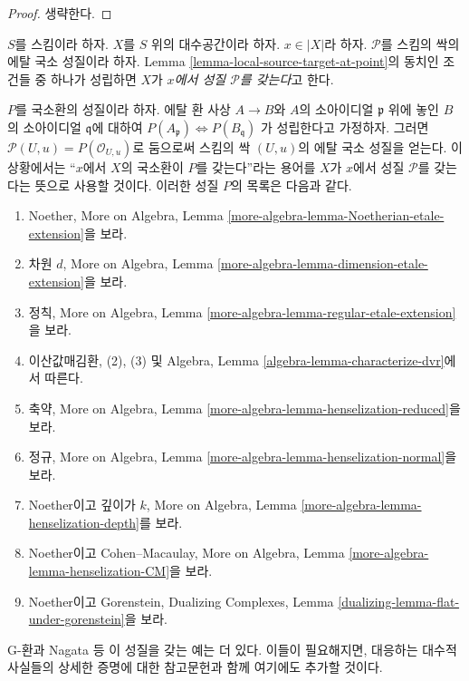 \begin{proof}
생략한다.
\end{proof}

\begin{definition}
\label{definition-property-at-point}
$S$를 스킴이라 하자. $X$를 $S$ 위의 대수공간이라 하자.
$x \in |X|$라 하자. $\mathcal{P}$를 스킴의 싹의 에탈 국소 성질이라 하자.
Lemma \ref{lemma-local-source-target-at-point}의 동치인 조건들 중 하나가
성립하면 $X$가 {\it $x$에서 성질 $\mathcal{P}$를 갖는다}고 한다.
\end{definition}

\begin{remark}
\label{remark-list-properties-local-ring-local-etale-topology}
$P$를 국소환의 성질이라 하자. 에탈 환 사상 $A \to B$와
$A$의 소아이디얼 $\mathfrak p$ 위에 놓인 $B$의 소아이디얼
$\mathfrak q$에 대하여
$P(A_\mathfrak p) \Leftrightarrow P(B_\mathfrak q)$
가 성립한다고 가정하자. 그러면
$\mathcal{P}(U, u) = P(\mathcal{O}_{U, u})$로 둠으로써
스킴의 싹 $(U, u)$의 에탈 국소 성질을 얻는다.
이 상황에서는 “$x$에서 $X$의 국소환이 $P$를 갖는다”라는 용어를
$X$가 $x$에서 성질 $\mathcal{P}$를 갖는다는 뜻으로 사용할 것이다.
이러한 성질 $P$의 목록은 다음과 같다.
\begin{enumerate}
\item Noether, More on Algebra, Lemma
\ref{more-algebra-lemma-Noetherian-etale-extension}을 보라.
\item 차원 $d$, More on Algebra, Lemma
\ref{more-algebra-lemma-dimension-etale-extension}을 보라.
\item 정칙, More on Algebra, Lemma
\ref{more-algebra-lemma-regular-etale-extension}을 보라.
\item 이산값매김환, (2), (3) 및 Algebra, Lemma
\ref{algebra-lemma-characterize-dvr}에서 따른다.
\item 축약, More on Algebra, Lemma
\ref{more-algebra-lemma-henselization-reduced}을 보라.
\item 정규, More on Algebra, Lemma
\ref{more-algebra-lemma-henselization-normal}을 보라.
\item Noether이고 깊이가 $k$, More on Algebra, Lemma
\ref{more-algebra-lemma-henselization-depth}를 보라.
\item Noether이고 Cohen--Macaulay, More on Algebra, Lemma
\ref{more-algebra-lemma-henselization-CM}을 보라.
\item Noether이고 Gorenstein, Dualizing Complexes, Lemma
\ref{dualizing-lemma-flat-under-gorenstein}을 보라.
\end{enumerate}
G-환과 Nagata 등 이 성질을 갖는 예는 더 있다. 이들이 필요해지면,
대응하는 대수적 사실들의 상세한 증명에 대한 참고문헌과 함께
여기에도 추가할 것이다.
\end{remark}

